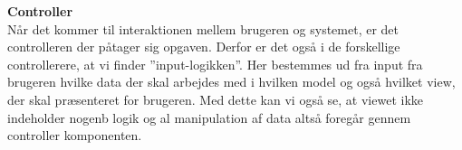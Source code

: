 \textbf{Controller}\\
Når det kommer til interaktionen mellem brugeren og systemet, er det controlleren der påtager sig opgaven.
Derfor er det også i de forskellige controllerere, at vi finder ''input-logikken''. Her bestemmes ud fra input fra brugeren hvilke data der skal arbejdes med i hvilken model og også hvilket view, der skal præsenteret for brugeren. Med dette kan vi også se, at viewet ikke indeholder nogenb logik og al manipulation af data altså foregår gennem controller komponenten.
